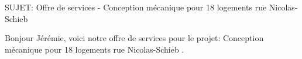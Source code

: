 SUJET: Offre de services - Conception mécanique pour 18 logements rue Nicolas-Schieb \par Bonjour Jérémie, voici notre offre de services pour le projet: Conception mécanique pour 18 logements rue Nicolas-Schieb .